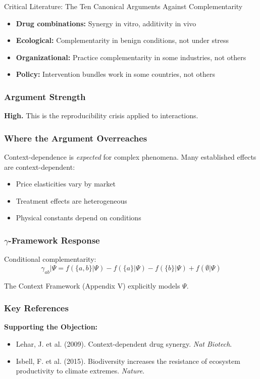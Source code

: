 \begin{chapter}{Critical Literature: The Ten Canonical Arguments Against Complementarity}
\begin{itemize}[noitemsep]
    \item \textbf{Drug combinations:} Synergy in vitro, additivity in vivo
    \item \textbf{Ecological:} Complementarity in benign conditions, not under stress
    \item \textbf{Organizational:} Practice complementarity in some industries, not others
    \item \textbf{Policy:} Intervention bundles work in some countries, not others
\end{itemize}

\subsubsection{Argument Strength}

\textbf{High.} This is the reproducibility crisis applied to interactions.

\subsubsection{Where the Argument Overreaches}

Context-dependence is \textit{expected} for complex phenomena. Many established effects are context-dependent:
\begin{itemize}[noitemsep]
    \item Price elasticities vary by market
    \item Treatment effects are heterogeneous
    \item Physical constants depend on conditions
\end{itemize}

\subsubsection{$\gamma$-Framework Response}

Conditional complementarity:
\[
\gamma_{ab}|\Psi = f(\{a,b\}|\Psi) - f(\{a\}|\Psi) - f(\{b\}|\Psi) + f(\emptyset|\Psi)
\]

The Context Framework (Appendix V) explicitly models $\Psi$.

\subsubsection{Key References}

\textbf{Supporting the Objection:}
\begin{itemize}[noitemsep]
    \item Lehar, J. et al. (2009). Context-dependent drug synergy. \textit{Nat Biotech}.
    \item Isbell, F. et al. (2015). Biodiversity increases the resistance of ecosystem productivity to climate extremes. \textit{Nature}.
\end{itemize}


\end{chapter}
